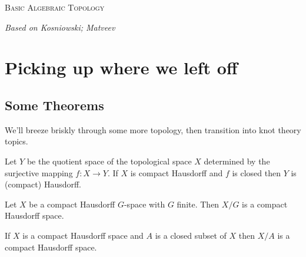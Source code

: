 \documentclass[nocover]{pset}
\begin{document}
\begin{center}
  {\scshape \Large Basic Algebraic Topology}

  {\itshape Based on Kosniowski; Matveev}
\end{center}
\vspace{-.1cm}
\hrulefill

\section{Picking up where we left off}
\begin{adjustwidth}{1em}{1em}
  \subsection{Some Theorems}
  We'll breeze briskly through some more topology, then transition
  into knot theory topics.
  \begin{theorem}
    Let $Y$ be the quotient space of the topological space $X$
    determined by the surjective mapping $f : X \to Y$. If $X$ is
    compact Hausdorff and $f$ is closed then $Y$ is (compact)
    Hausdorff.
  \end{theorem}
  \begin{corollary}
    Let $X$ be a compact Hausdorff $G$-space with $G$ finite. Then
    $X/G$ is a compact Hausdorff space.
  \end{corollary}
  \begin{corollary}
    If $X$ is a compact Hausdorff space and $A$ is a closed subset of
    $X$ then $X/A$ is a compact Hausdorff space.
  \end{corollary}
  \end{adjustwidth}
\end{document}

